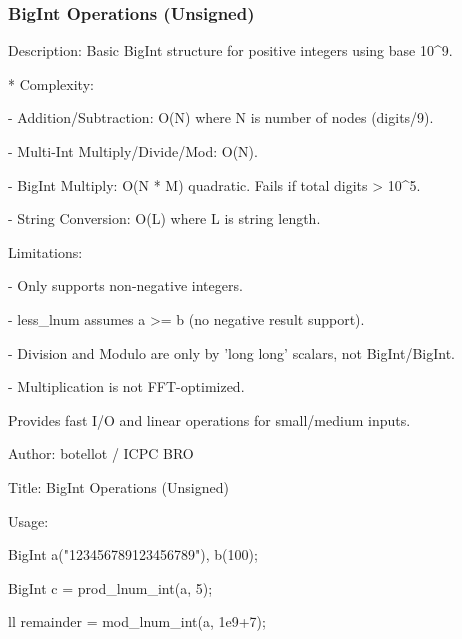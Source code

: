 \documentclass[10pt,landscape,twocolumn]{article}
\begin{document}
\subsubsection{BigInt Operations (Unsigned)}
\begin{flushleft}
\footnotesize\ttfamily
\par\noindent Description: Basic BigInt structure for positive integers using base 10\textasciicircum{}9.
\par\noindent * * Complexity:
\par\noindent - Addition/Subtraction: O(N) where N is number of nodes (digits/9).
\par\noindent - Multi-Int Multiply/Divide/Mod: O(N).
\par\noindent - BigInt Multiply: O(N * M) quadratic. Fails if total digits \textgreater{} 10\textasciicircum{}5.
\par\noindent - String Conversion: O(L) where L is string length.
\par\noindent * Limitations:
\par\noindent - Only supports non-negative integers.
\par\noindent - less\_lnum assumes a \textgreater{}= b (no negative result support).
\par\noindent - Division and Modulo are only by 'long long' scalars, not BigInt/BigInt.
\par\noindent - Multiplication is not FFT-optimized.
\par\noindent Provides fast I/O and linear operations for small/medium inputs.
\par\noindent Author: botellot / ICPC BRO
\par\noindent Title: BigInt Operations (Unsigned)
\par\noindent * Usage:
\par\noindent BigInt a("123456789123456789"), b(100);
\par\noindent BigInt c = prod\_lnum\_int(a, 5);
\par\noindent ll remainder = mod\_lnum\_int(a, 1e9+7);
\end{flushleft}
\end{document}
